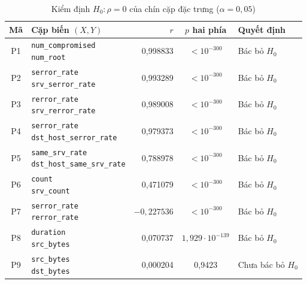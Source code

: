 \documentclass[../main.tex]{subfiles}
\begin{document}
\begin{table}[htbp]
\centering
\caption{Kiểm định $H_0:\rho=0$ của chín cặp đặc trưng ($\alpha=0{,}05$)}
\label{tab:t31:tests}
\footnotesize
\setlength{\tabcolsep}{3.8pt}
\renewcommand{\arraystretch}{1.06}
\begin{tabular}{@{}cp{6.0cm}rcl@{}}
\toprule
Mã & Cặp biến $(X,Y)$ & $r$ & $p$ hai phía & Quyết định\\
\midrule
P1 & \shortstack[l]{\texttt{num\_compromised} \\ \texttt{num\_root}} & 0{,}998833 & $<10^{-300}$ & Bác bỏ $H_0$\\
P2 & \shortstack[l]{\texttt{serror\_rate} \\ \texttt{srv\_serror\_rate}} & 0{,}993289 & $<10^{-300}$ & Bác bỏ $H_0$\\
P3 & \shortstack[l]{\texttt{rerror\_rate} \\ \texttt{srv\_rerror\_rate}} & 0{,}989008 & $<10^{-300}$ & Bác bỏ $H_0$\\
P4 & \shortstack[l]{\texttt{serror\_rate} \\ \texttt{dst\_host\_serror\_rate}} & 0{,}979373 & $<10^{-300}$ & Bác bỏ $H_0$\\
P5 & \shortstack[l]{\texttt{same\_srv\_rate} \\ \texttt{dst\_host\_same\_srv\_rate}} & 0{,}788978 & $<10^{-300}$ & Bác bỏ $H_0$\\
P6 & \shortstack[l]{\texttt{count} \\ \texttt{srv\_count}} & 0{,}471079 & $<10^{-300}$ & Bác bỏ $H_0$\\
P7 & \shortstack[l]{\texttt{serror\_rate} \\ \texttt{rerror\_rate}} & $-0{,}227536$ & $<10^{-300}$ & Bác bỏ $H_0$\\
P8 & \shortstack[l]{\texttt{duration} \\ \texttt{src\_bytes}} & 0{,}070737 & $1{,}929\cdot10^{-139}$ & Bác bỏ $H_0$\\
P9 & \shortstack[l]{\texttt{src\_bytes} \\ \texttt{dst\_bytes}} & 0{,}000204 & 0{,}9423 & Chưa bác bỏ $H_0$\\
\bottomrule
\end{tabular}
\end{table}
\end{document}
